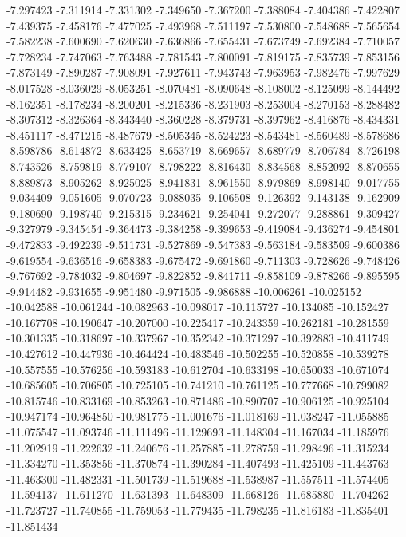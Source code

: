 -7.297423
-7.311914
-7.331302
-7.349650
-7.367200
-7.388084
-7.404386
-7.422807
-7.439375
-7.458176
-7.477025
-7.493968
-7.511197
-7.530800
-7.548688
-7.565654
-7.582238
-7.600690
-7.620630
-7.636866
-7.655431
-7.673749
-7.692384
-7.710057
-7.728234
-7.747063
-7.763488
-7.781543
-7.800091
-7.819175
-7.835739
-7.853156
-7.873149
-7.890287
-7.908091
-7.927611
-7.943743
-7.963953
-7.982476
-7.997629
-8.017528
-8.036029
-8.053251
-8.070481
-8.090648
-8.108002
-8.125099
-8.144492
-8.162351
-8.178234
-8.200201
-8.215336
-8.231903
-8.253004
-8.270153
-8.288482
-8.307312
-8.326364
-8.343440
-8.360228
-8.379731
-8.397962
-8.416876
-8.434331
-8.451117
-8.471215
-8.487679
-8.505345
-8.524223
-8.543481
-8.560489
-8.578686
-8.598786
-8.614872
-8.633425
-8.653719
-8.669657
-8.689779
-8.706784
-8.726198
-8.743526
-8.759819
-8.779107
-8.798222
-8.816430
-8.834568
-8.852092
-8.870655
-8.889873
-8.905262
-8.925025
-8.941831
-8.961550
-8.979869
-8.998140
-9.017755
-9.034409
-9.051605
-9.070723
-9.088035
-9.106508
-9.126392
-9.143138
-9.162909
-9.180690
-9.198740
-9.215315
-9.234621
-9.254041
-9.272077
-9.288861
-9.309427
-9.327979
-9.345454
-9.364473
-9.384258
-9.399653
-9.419084
-9.436274
-9.454801
-9.472833
-9.492239
-9.511731
-9.527869
-9.547383
-9.563184
-9.583509
-9.600386
-9.619554
-9.636516
-9.658383
-9.675472
-9.691860
-9.711303
-9.728626
-9.748426
-9.767692
-9.784032
-9.804697
-9.822852
-9.841711
-9.858109
-9.878266
-9.895595
-9.914482
-9.931655
-9.951480
-9.971505
-9.986888
-10.006261
-10.025152
-10.042588
-10.061244
-10.082963
-10.098017
-10.115727
-10.134085
-10.152427
-10.167708
-10.190647
-10.207000
-10.225417
-10.243359
-10.262181
-10.281559
-10.301335
-10.318697
-10.337967
-10.352342
-10.371297
-10.392883
-10.411749
-10.427612
-10.447936
-10.464424
-10.483546
-10.502255
-10.520858
-10.539278
-10.557555
-10.576256
-10.593183
-10.612704
-10.633198
-10.650033
-10.671074
-10.685605
-10.706805
-10.725105
-10.741210
-10.761125
-10.777668
-10.799082
-10.815746
-10.833169
-10.853263
-10.871486
-10.890707
-10.906125
-10.925104
-10.947174
-10.964850
-10.981775
-11.001676
-11.018169
-11.038247
-11.055885
-11.075547
-11.093746
-11.111496
-11.129693
-11.148304
-11.167034
-11.185976
-11.202919
-11.222632
-11.240676
-11.257885
-11.278759
-11.298496
-11.315234
-11.334270
-11.353856
-11.370874
-11.390284
-11.407493
-11.425109
-11.443763
-11.463300
-11.482331
-11.501739
-11.519688
-11.538987
-11.557511
-11.574405
-11.594137
-11.611270
-11.631393
-11.648309
-11.668126
-11.685880
-11.704262
-11.723727
-11.740855
-11.759053
-11.779435
-11.798235
-11.816183
-11.835401
-11.851434
